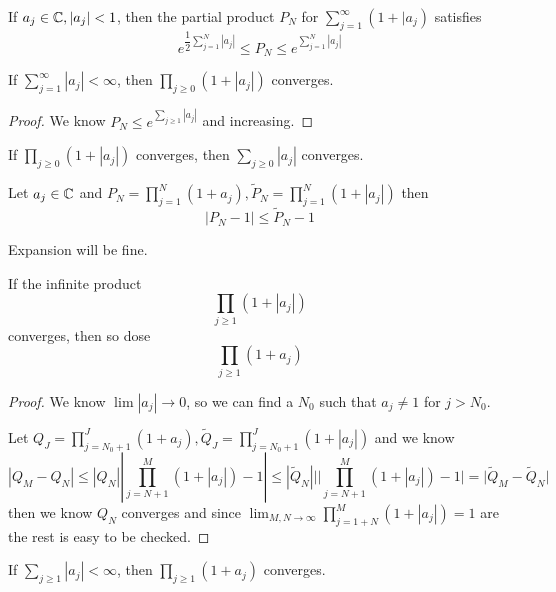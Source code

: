 \begin{corollary}
    If $a_j \in \mathbb{C}, |a_j| < 1$, then the partial product $P_N$ for $\sum\limits_{j=1}^{\infty}(1+|a_j)$
    satisfies
    \[
    e^{\dfrac{1}{2}\sum\limits_{j=1}^N|a_j|} \leq  P_N \leq e^{\sum\limits_{j=1}^N|a_j|}
    \]
\end{corollary}

\begin{corollary}
    If $\sum\limits_{j=1}^{\infty} |a_j| < \infty $, then $\prod_{j\geq 0}(1+|a_j|)$ converges.
\end{corollary}
\begin{proof}
    We know $P_N \leq e^{\sum\limits_{j\geq 1}|a_j|}$ and increasing.
\end{proof}

\begin{corollary}
    If $\prod_{j\geq 0}(1+|a_j|)$ converges, then $\sum\limits_{j\geq 0}|a_j|$ converges.
\end{corollary}

\begin{lemma}
    Let $a_j \in \mathbb{C}$ and $P_N = \prod\limits_{j=1}^N (1+a_j), \tilde{P}_N = \prod\limits_{j=1}^N(1+|a_j|)$ then
    \[|P_N - 1| \leq \tilde P_N - 1\]
\end{lemma}
Expansion will be fine.

\begin{theorem}
    If the infinite product
    \[ \prod_{j\geq 1}(1+|a_j|)\]
    converges, then so dose
    \[ \prod_{j\geq 1}(1+a_j)\]
\end{theorem}
\begin{proof}
    We know $\lim |a_j| \to 0$, so we can find a $N_0$ such that $a_j\neq 1$ for $j > N_0$.\par
    Let $Q_J = \prod_{j=N_0+1}^{J}(1+a_j),\tilde{Q}_J = \prod_{j=N_0+1}^{J}(1+|a_j|)$ and we know
    \[
    |Q_M - Q_N| \leq |Q_N||\prod_{j=N+1}^M(1+|a_j|)-1| \leq |\tilde{Q}_N|||\prod_{j=N+1}^M(1+|a_j|)-1| = |\tilde{Q}_M-\tilde{Q}_N|
    \]
    then we know $Q_N$ converges and since $\lim_{M,N\to\infty} \prod_{j=1+N}^M (1+|a_j|) = 1$ are the rest is easy to be checked.
\end{proof}

\begin{corollary}
    If $\sum\limits_{j\geq 1} |a_j| < \infty$, then $\prod_{j\geq 1}(1+a_j)$ converges.
\end{corollary}

